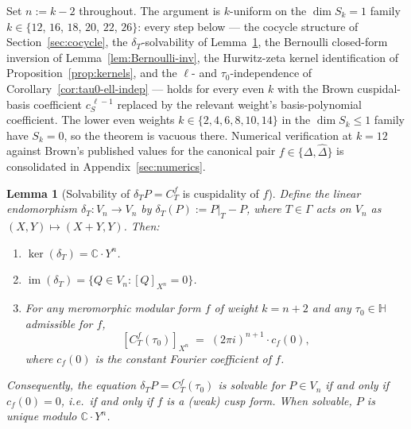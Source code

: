 \documentclass[11pt]{article}
\newtheorem{lemma}[theorem]{Lemma}
\numberwithin{equation}{section}  %
\newcommand{\HH}{\mathbb{H}}
\newcommand{\CC}{\mathbb{C}}
\newcommand{\Dhat}{\widehat{\Delta}}
\begin{document}
Set $n := k - 2$ throughout.  The argument is $k$-uniform on the
$\dim S_k = 1$ family $k \in \{12$, $16$, $18$, $20$, $22$, $26\}$: every step
below --- the cocycle structure of Section~\ref{sec:cocycle}, the
$\delta_T$-solvability of Lemma~\ref{lem:solvability-cuspidality},
the Bernoulli closed-form inversion of
Lemma~\ref{lem:Bernoulli-inv}, the Hurwitz-zeta kernel
identification of Proposition~\ref{prop:kernels}, and the
$\ell$- and $\tau_0$-independence of Corollary~\ref{cor:tau0-ell-indep} ---
holds for every even $k$ with
the Brown cuspidal-basis coefficient $c_S^{\,\ell - 1}$ replaced by the
relevant weight's basis-polynomial coefficient.  The lower even weights
$k \in \{2, 4, 6, 8, 10, 14\}$ in the $\dim S_k \le 1$ family have
$S_k = 0$, so the theorem is vacuous there.  Numerical verification at
$k = 12$ against Brown's published values for the canonical pair
$f \in \{\Delta, \Dhat\}$ is consolidated in
Appendix~\ref{sec:numerics}.

\begin{lemma}[Solvability of $\delta_T P = C^f_T$ is cuspidality of $f$]\label{lem:solvability-cuspidality}
Define the linear endomorphism $\delta_T \colon V_n \to V_n$ by
$\delta_T(P) := P|_T - P$, where $T \in \Gamma$ acts on $V_n$ as
$(X, Y) \mapsto (X + Y, Y)$.  Then:
\begin{enumerate}[label=(\alph*),leftmargin=2em]\itemsep0.25em
\item $\ker(\delta_T) = \CC \cdot Y^n$.
\item $\operatorname{im}(\delta_T) = \{Q \in V_n : [Q]_{X^n} = 0\}$.
\item For any meromorphic modular form $f$ of weight $k = n + 2$ and any
  $\tau_0 \in \HH$ admissible for $f$,
\begin{equation}\label{eq:CfT-Xn-coeff}
  [C^f_T(\tau_0)]_{X^n} \;=\; (2\pi i)^{n+1} \cdot c_f(0),
\end{equation}
where $c_f(0)$ is the constant Fourier coefficient of $f$.
\end{enumerate}
Consequently, the equation $\delta_T P = C^f_T(\tau_0)$ is solvable for
$P \in V_n$ if and only if $c_f(0) = 0$, i.e.\ if and only if $f$ is a
(weak) cusp form.  When solvable, $P$ is unique modulo $\CC \cdot Y^n$.
\end{lemma}
\end{document}
